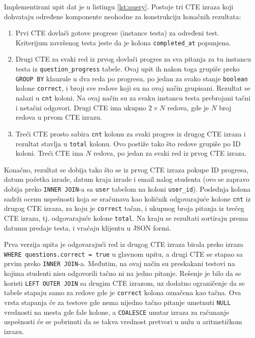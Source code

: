 {Implementirani upit dat je u listingu \ref{lst:query}. Postoje tri CTE izraza koji dohvataju određene komponente neohodne za konstrukciju konačnih rezultata:
\begin{enumerate}
\item Prvi CTE dovlači gotove progrese (instance testa) za određeni test. Kriterijum završenog testa jeste da je kolona \texttt{completed\_at} popunjena.
\item Drugi CTE za svaki red iz prvog dovlači progres za sva pitanja za tu instancu testa iz \texttt{question\_progress} tabele. Ovaj upit ih nakon toga grupiše preko \texttt{GROUP BY} klauzule u dva reda po progresu, po jedan za svako stanje \texttt{boolean} kolone \texttt{correct}, i broji sve redove koji su na ovaj način grupisani. Rezultat se nalazi u \texttt{cnt} koloni. Na ovaj način su za svaku instancu testa prebrojani tačni i netačni odgovori. Drugi CTE ima ukupno $2 \times N$ redova, gde je $N$ broj redova u prvom CTE izrazu.
\item Treći CTE prosto sabira \texttt{cnt} kolonu za svaki progres iz drugog CTE izraza i rezultat stavlja u \texttt{total} kolonu. Ovo postiže tako što redove grupiše po ID koloni. Treći CTE ima $N$ redova, po jedan za svaki red iz prvog CTE izraza.
\end{enumerate}

Konačno, rezultat se dobija tako što se iz prvog CTE izraza pokupe ID progresa, datum početka izrade, datum kraja izrade i email nalog studenta (ovo se zapravo dobija preko \texttt{INNER JOIN}-a sa \texttt{user} tabelom na koloni \texttt{user\_id}). Poslednja kolona sadrži ocenu uspešnosti koja se sračunava kao količnik odgovarajuće kolone \texttt{cnt} iz drugog CTE izraza, za koju je \texttt{correct} tačan, i ukupnog broja pitanja iz trećeg CTE izraza, tj. odgovarajuće kolone \texttt{total}. Na kraju se rezultati sortiraju prema datumu predaje testa, i vraćaju klijentu u JSON formi.

Prva verzija upita je odgovarajući red iz drugog CTE izraza birala preko izraza \texttt{WHERE questions.correct = true} u glavnom upitu, a drugi CTE se stapao sa prvim preko \texttt{INNER JOIN}-a. Međutim, na ovaj način su preskakani testovi na kojima studenti nisu odgovorili tačno ni na jedno pitanje. Rešenje je bilo da se koristi \texttt{LEFT OUTER JOIN} sa drugim CTE izrazom, uz dodatno ograničenje da se tabele stapaju samo za redove gde je \texttt{correct} kolona označena kao tačna. Ova vrsta stapanja će za testove gde nema nijedno tačno pitanje umetnuti \texttt{NULL} vrednosti na mesta gde fale kolone, a \texttt{COALESCE} unutar izraza za računanje uspešnosti će se pobrinuti da se takva vrednost pretvori u nulu u aritmetičkom izrazu.

}
